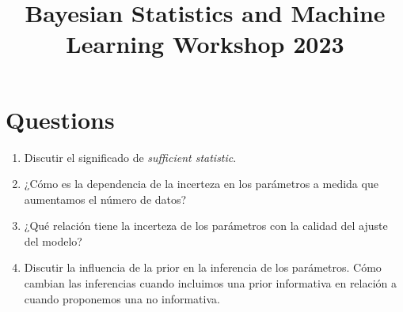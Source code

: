 \documentclass[12pt]{paper}
\title{\begin{center}Bayesian Statistics and Machine Learning Workshop 2023\end{center}}
\subtitle{\begin{center}\Large Estimación de parámetros y la distribución gaussiana\\ Martín Onetto \end{center}}
\begin{document}
\maketitle


\topmargin -2.0cm
\oddsidemargin -0.2cm
\evensidemargin -0.2cm

\vspace{-80pt}

\section{Questions}

\begin{enumerate}
\item Discutir el significado de \textit{sufficient statistic}.
\item ¿Cómo es la dependencia de la incerteza en los parámetros a medida que aumentamos el número de datos?
\item ¿Qué relación tiene la incerteza de los parámetros con la calidad del ajuste del modelo? 
\item Discutir la influencia de la prior en la inferencia de los parámetros. Cómo cambian las inferencias cuando incluimos una prior informativa en relación a cuando proponemos una no informativa.
\end{enumerate}
\end{document}
